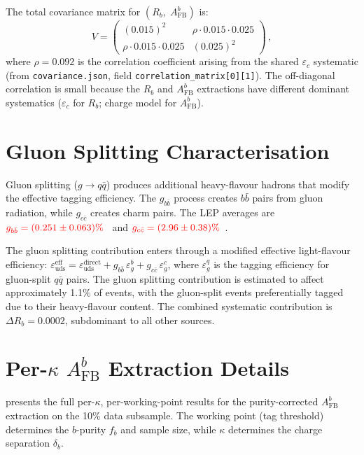 \documentclass[11pt,a4paper]{article}
\newcommand{\external}[1]{\textcolor{red}{#1}}
\begin{document}
The total covariance matrix for
$(R_b,\; A_\text{FB}^b)$ is:
\begin{equation}
V = \begin{pmatrix}
(0.015)^2 & \rho \cdot 0.015 \cdot 0.025 \\
\rho \cdot 0.015 \cdot 0.025 & (0.025)^2
\end{pmatrix}\,,
\label{eq:covariance}
\end{equation}
where $\rho = 0.092$ is the correlation coefficient arising
from the shared $\varepsilon_c$ systematic
(from \texttt{covariance.json}, field \texttt{correlation\_matrix[0][1]}).
The off-diagonal correlation is small because the $R_b$ and
$A_\text{FB}^b$ extractions have different dominant systematics
($\varepsilon_c$ for $R_b$; charge model for $A_\text{FB}^b$).

\section{Gluon Splitting Characterisation}
\label{app:gluon}

Gluon splitting ($g \to q\bar{q}$) produces additional heavy-flavour
hadrons that modify the effective tagging efficiency.
The $g_{b\bar{b}}$ process creates $b\bar{b}$ pairs from gluon
radiation, while $g_{c\bar{c}}$ creates charm pairs.
The LEP averages are
$\external{g_{b\bar{b}} = (0.251 \pm 0.063)\%}$~\cite{ALEPH:gbb}
and $\external{g_{c\bar{c}} = (2.96 \pm 0.38)\%}$~\cite{LEP:gcc}.

The gluon splitting contribution enters through a modified effective
light-flavour efficiency:
$\varepsilon_\text{uds}^\text{eff} = \varepsilon_\text{uds}^\text{direct}
+ g_{b\bar{b}}\,\varepsilon_g^b + g_{c\bar{c}}\,\varepsilon_g^c$,
where $\varepsilon_g^q$ is the tagging efficiency for gluon-split
$q\bar{q}$ pairs.
The gluon splitting contribution is estimated to affect
approximately 1.1\% of events, with the gluon-split events
preferentially tagged due to their heavy-flavour content.
The combined systematic contribution is $\Delta R_b = 0.0002$,
subdominant to all other sources.

\section{Per-$\kappa$ $A_\text{FB}^b$ Extraction Details}
\label{app:afb_details}

 presents the full per-$\kappa$,
per-working-point results for the purity-corrected
$A_\text{FB}^b$ extraction on the 10\% data subsample.
The working point (tag threshold) determines the $b$-purity
$f_b$ and sample size, while $\kappa$ determines the charge
separation $\delta_b$.
\end{document}

